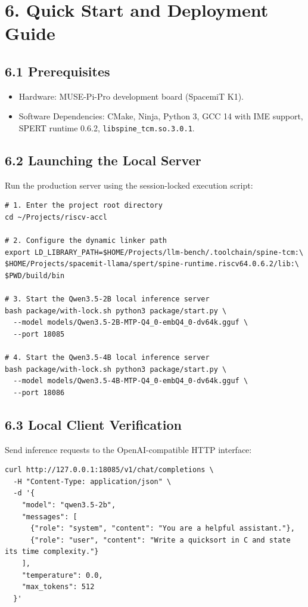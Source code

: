 \documentclass[10pt,a4paper]{article}
\begin{document}
\section{6. Quick Start and Deployment Guide}

\subsection{6.1 Prerequisites}
\begin{itemize}
  \item Hardware: MUSE-Pi-Pro development board (SpacemiT K1).
  \item Software Dependencies: CMake, Ninja, Python 3, GCC 14 with IME support, SPERT runtime 0.6.2, \texttt{libspine\_tcm.so.3.0.1}.
\end{itemize}

\subsection{6.2 Launching the Local Server}
Run the production server using the session-locked execution script:

\begin{Verbatim}[breaklines=true, breakanywhere=true, fontsize=\small]
# 1. Enter the project root directory
cd ~/Projects/riscv-accl

# 2. Configure the dynamic linker path
export LD_LIBRARY_PATH=$HOME/Projects/llm-bench/.toolchain/spine-tcm:\
$HOME/Projects/spacemit-llama/spert/spine-runtime.riscv64.0.6.2/lib:\
$PWD/build/bin

# 3. Start the Qwen3.5-2B local inference server
bash package/with-lock.sh python3 package/start.py \
  --model models/Qwen3.5-2B-MTP-Q4_0-embQ4_0-dv64k.gguf \
  --port 18085

# 4. Start the Qwen3.5-4B local inference server
bash package/with-lock.sh python3 package/start.py \
  --model models/Qwen3.5-4B-MTP-Q4_0-embQ4_0-dv64k.gguf \
  --port 18086
\end{Verbatim}

\subsection{6.3 Local Client Verification}
Send inference requests to the OpenAI-compatible HTTP interface:

\begin{Verbatim}[breaklines=true, breakanywhere=true, fontsize=\small]
curl http://127.0.0.1:18085/v1/chat/completions \
  -H "Content-Type: application/json" \
  -d '{
    "model": "qwen3.5-2b",
    "messages": [
      {"role": "system", "content": "You are a helpful assistant."},
      {"role": "user", "content": "Write a quicksort in C and state its time complexity."}
    ],
    "temperature": 0.0,
    "max_tokens": 512
  }'
\end{Verbatim}
\end{document}
